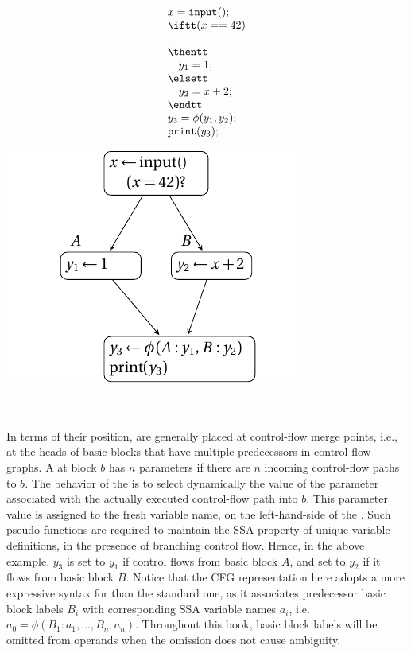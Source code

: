 ~\\
\begin{minipage}{0.4\textwidth}
\begin{equation*}
\begin{array}{l}
x = \texttt{input}();\\
\iftt (x == 42)\\
\\
\thentt\\
\quad    y_1 = 1;\\
\elsett\\
\quad    y_2 = x + 2;\\
\endtt\\
y_3 = \phi(y_1,y_2);\\
\texttt{print}(y_3);\\
\end{array}
\end{equation*}
\end{minipage}
\begin{minipage}{0.4\textwidth}
\includegraphics[scale=0.9]{ifthenelse-ssa.pdf}
\end{minipage}
~\\\\


In terms of their position, 
\phifuns{} are generally placed at control-flow merge points,
i.e., at the heads of basic blocks that have multiple predecessors in
control-flow graphs.
A \phifun at block $b$ has
$n$ parameters if there are $n$ incoming control-flow paths to $b$.
The behavior of the \phifun is to select dynamically
the value of the parameter associated with the actually executed
control-flow path into $b$.
This parameter value is assigned to the fresh variable name,
on the left-hand-side of the \phifun.
Such pseudo-functions are required to maintain the SSA property
of unique variable definitions,
in the presence of branching control flow.
Hence, in the above example, $y_3$ is set to $y_1$ if 
control flows from basic block $A$, and set to $y_2$ if it flows from
basic block $B$.
Notice that the CFG representation here adopts a more expressive syntax for
\phifuns than the standard one, as it associates predecessor basic block labels $B_i$
with corresponding SSA variable names $a_i$, i.e.\
$a_0 = \phi(B_1:a_1, \ldots, B_n:a_n)$.
Throughout this book, basic block labels will be omitted from \phifn
operands when the omission does not cause ambiguity.

